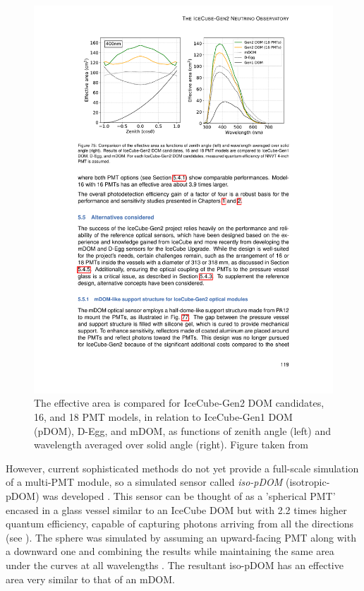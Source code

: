 \begin{figure}
    \includegraphics{./figures/gen2/EffectiveAreaCurve_TDR.pdf}
    \caption{The effective area is compared for IceCube-Gen2 DOM candidates, 16, and 18 PMT models, in relation to IceCube-Gen1 DOM (pDOM), D-Egg, and mDOM, as functions of zenith angle (left) and wavelength averaged over solid angle (right). Figure taken from \cite{Gen2_TDR}} 
\end{figure}


However, current sophisticated methods do not yet provide a full-scale simulation of a multi-PMT module, so a simulated sensor called \emph{iso-pDOM} (isotropic-pDOM) was developed . This sensor can be thought of as a 'spherical PMT' encased in a glass vessel similar to an IceCube DOM but with 2.2 times higher quantum efficiency, capable of capturing photons arriving from all the directions (see ). The sphere was simulated by assuming an upward-facing PMT along with a downward one and combining the results while maintaining the same area under the curves at all wavelengths . The resultant iso-pDOM has an effective area very similar to that of an mDOM.


